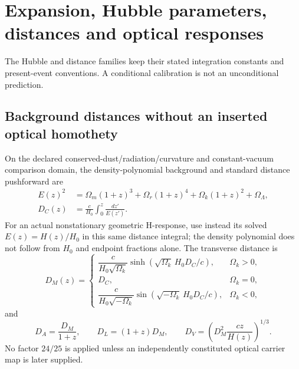\documentclass[12pt,a4paper]{article}
\begin{document}
\section{Expansion, Hubble parameters, distances and optical responses}
\label{p6b:sec:organized-b3}
The Hubble and distance families keep their stated integration constants and present-event conventions. A conditional calibration is not an unconditional prediction.

\subsection{Background distances without an inserted optical homothety}
\label{p9:sec:background-distances-optical-transport}
On the declared conserved-dust/radiation/curvature and constant-vacuum comparison domain, the density-polynomial background and standard distance pushforward are
\begin{align}
E(z)^2&=\Omega_m(1+z)^3+\Omega_r(1+z)^4
      +\Omega_k(1+z)^2+\Omega_\Lambda,\\
D_C(z)&=\frac{c}{H_0}\int_0^z\frac{dz'}{E(z')}.
\label{p9:eq:background-distance-core}
\end{align}
For an actual nonstationary geometric H-response, use instead its solved
$E(z)=H(z)/H_0$ in this same distance integral; the density polynomial
does not follow from $H_0$ and endpoint fractions alone. The transverse distance is
\begin{equation}
D_M(z)=
\begin{cases}
\dfrac{c}{H_0\sqrt{\Omega_k}}
\sinh\!\left(\sqrt{\Omega_k}\,H_0D_C/c\right),&\Omega_k>0,\\[1ex]
D_C,&\Omega_k=0,\\[1ex]
\dfrac{c}{H_0\sqrt{-\Omega_k}}
\sin\!\left(\sqrt{-\Omega_k}\,H_0D_C/c\right),&\Omega_k<0,
\end{cases}
\end{equation}
and
\[
D_A=\frac{D_M}{1+z},\qquad D_L=(1+z)D_M,
\qquad D_V=\left(D_M^2\frac{cz}{H(z)}\right)^{1/3}.
\]
No factor \(24/25\) is applied unless an independently constituted optical
carrier map is later supplied.
\end{document}
